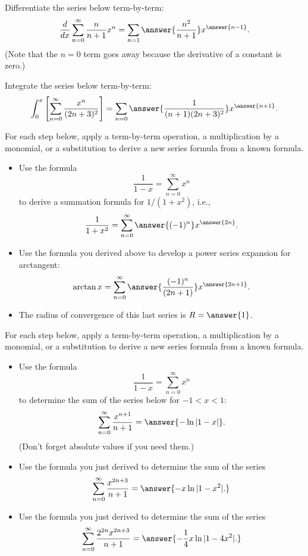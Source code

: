 \documentclass{ximera}
\begin{document}
\begin{exercise}
Differentiate the series below term-by-term:
\[ \frac{d}{dx} \sum_{n=0}^\infty \frac{n}{n+1} x^n = \sum_{n=1} \answer{\frac{n^2}{n+1}} x^{\answer{n-1}}. \]
(Note that the $n=0$ term goes away because the derivative of a constant is zero.)
\end{exercise}

\begin{exercise}
Integrate the series below term-by-term:
\[ \int_0^x \left[ \sum_{n=0}^\infty \frac{x^n}{(2n+3)^2} \right]  = \sum_{n=0} \answer{\frac{1}{(n+1)(2n+3)^2}} x^{\answer{n+1}}. \]
\end{exercise}

\begin{exercise}
For each step below, apply a term-by-term operation, a multiplication by a monomial, or a substitution to derive a new series formula from a known formula.
\begin{itemize}
\item Use the formula \[ \frac{1}{1-x} = \sum_{n=0}^\infty x^n \]
to derive a summation formula for $1/(1+x^2)$, i.e.,
\[ \frac{1}{1+x^2} = \sum_{n=0}^\infty \answer{(-1)^n} x^{\answer{2n}}. \]
\item Use the formula you derived above to develop a power series expansion for arctangent:
\[ \arctan x = \sum_{n=0}^\infty \answer{\frac{(-1)^n}{(2n+1)}} x^{\answer{2n+1}}. \]
\item The radius of convergence of this last series is $R = \answer{1}$.
\end{itemize}
\end{exercise}

\begin{exercise}
For each step below, apply a term-by-term operation, a multiplication by a monomial, or a substitution to derive a new series formula from a known formula.
\begin{itemize}
\item Use the formula \[ \frac{1}{1-x}   = \sum_{n=0}^\infty x^n \] to determine the sum of the series below for $-1 < x < 1$:
\[ \sum_{n = 0}^\infty \frac{x^{n+1}}{n+1} = \answer{- \ln |1-x|}. \]
(Don't forget absolute values if you need them.)
\item Use the formula you just derived to determine the sum of the series
\[ \sum_{n=0}^\infty \frac{x^{2n+3}}{n+1} = \answer{- x \ln |1-x^2|.} \]
\item Use the formula you just derived to determine the sum of the series
\[ \sum_{n=0}^\infty \frac{2^{2n} x^{2n+3}}{n+1} = \answer{- \frac{1}{4} x \ln |1-4x^2|.} \]
\end{itemize}
\end{exercise}
\end{document}
